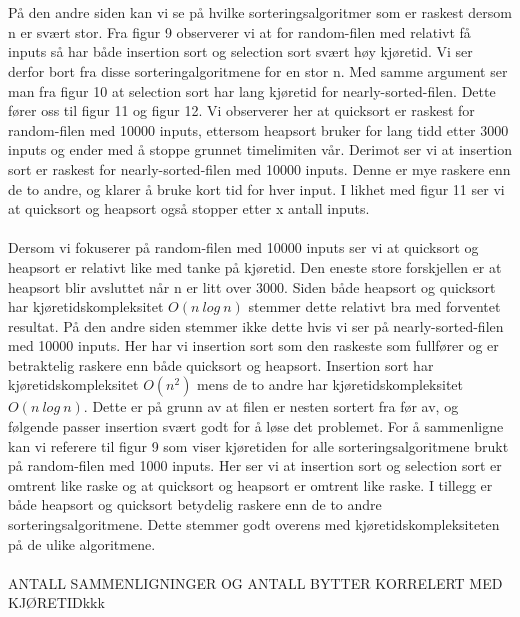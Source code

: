\documentclass[a4paper, article, oneside, norsk]{memoir} %
\newcommand{\0}{\mathbf{0}}
\newcommand{\1}{\mathbf{1}}
\begin{document}
\\
\\
På den andre siden kan vi se på hvilke sorteringsalgoritmer som er raskest dersom n er svært stor. Fra figur 9 observerer vi at for random-filen med relativt få inputs så har både insertion sort og selection sort svært høy kjøretid. Vi ser derfor bort fra disse sorteringalgoritmene for en stor n. Med samme argument ser man fra figur 10 at selection sort har lang kjøretid for nearly-sorted-filen. Dette fører oss til figur 11 og figur 12. Vi observerer her at quicksort er raskest for random-filen med 10000 inputs, ettersom heapsort bruker for lang tidd etter 3000 inputs og ender med å stoppe grunnet timelimiten vår. Derimot ser vi at insertion sort er raskest for nearly-sorted-filen med 10000 inputs. Denne er mye raskere enn de to andre, og klarer å bruke kort tid for hver input. I likhet med figur 11 ser vi at quicksort og heapsort også stopper etter x antall inputs. 
\\
\\
Dersom vi fokuserer på random-filen med 10000 inputs ser vi at quicksort og heapsort er relativt like med tanke på kjøretid. Den eneste store forskjellen er at heapsort blir avsluttet når n er litt over 3000. Siden både heapsort og quicksort har kjøretidskompleksitet $O(n \  log \ n)$ stemmer dette relativt bra med forventet resultat. På den andre siden stemmer ikke dette hvis vi ser på nearly-sorted-filen med 10000 inputs. Her har vi insertion sort som den raskeste som fullfører og er betraktelig raskere enn både quicksort og heapsort. Insertion sort har kjøretidskompleksitet $O(n^{2})$ mens de to andre har kjøretidskompleksitet $O(n \ log \ n)$. Dette er på grunn av at filen er nesten sortert fra før av, og følgende passer insertion svært godt for å løse det problemet. For å sammenligne kan vi referere til figur 9 som viser kjøretiden for alle sorteringsalgoritmene brukt på random-filen med 1000 inputs. Her ser vi at insertion sort og selection sort er omtrent like raske og at quicksort og heapsort er omtrent like raske. I tillegg er både heapsort og quicksort betydelig raskere enn de to andre sorteringsalgoritmene. Dette stemmer godt overens med kjøretidskompleksiteten på de ulike algoritmene.
\\
\\
ANTALL SAMMENLIGNINGER OG ANTALL BYTTER KORRELERT MED KJØRETIDkkk
\\
\end{document}
